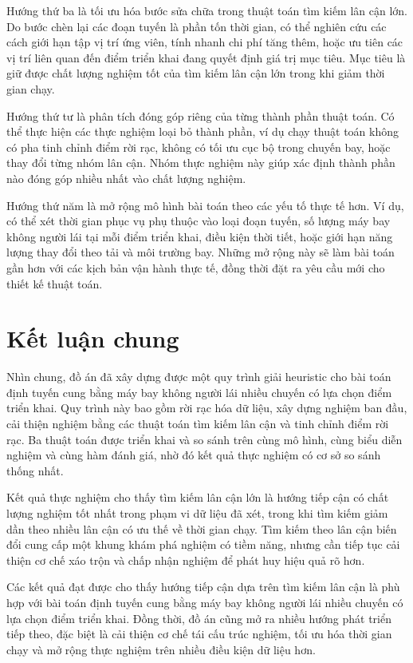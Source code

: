 Hướng thứ ba là tối ưu hóa bước sửa chữa trong thuật toán tìm kiếm lân cận lớn. Do bước chèn lại các đoạn tuyến là phần tốn thời gian, có thể nghiên cứu các cách giới hạn tập vị trí ứng viên, tính nhanh chi phí tăng thêm, hoặc ưu tiên các vị trí liên quan đến điểm triển khai đang quyết định giá trị mục tiêu. Mục tiêu là giữ được chất lượng nghiệm tốt của tìm kiếm lân cận lớn trong khi giảm thời gian chạy.

Hướng thứ tư là phân tích đóng góp riêng của từng thành phần thuật toán. Có thể thực hiện các thực nghiệm loại bỏ thành phần, ví dụ chạy thuật toán không có pha tinh chỉnh điểm rời rạc, không có tối ưu cục bộ trong chuyến bay, hoặc thay đổi từng nhóm lân cận. Nhóm thực nghiệm này giúp xác định thành phần nào đóng góp nhiều nhất vào chất lượng nghiệm.

Hướng thứ năm là mở rộng mô hình bài toán theo các yếu tố thực tế hơn. Ví dụ, có thể xét thời gian phục vụ phụ thuộc vào loại đoạn tuyến, số lượng máy bay không người lái tại mỗi điểm triển khai, điều kiện thời tiết, hoặc giới hạn năng lượng thay đổi theo tải và môi trường bay. Những mở rộng này sẽ làm bài toán gần hơn với các kịch bản vận hành thực tế, đồng thời đặt ra yêu cầu mới cho thiết kế thuật toán.

\section{Kết luận chung}

Nhìn chung, đồ án đã xây dựng được một quy trình giải heuristic cho bài toán định tuyến cung bằng máy bay không người lái nhiều chuyến có lựa chọn điểm triển khai. Quy trình này bao gồm rời rạc hóa dữ liệu, xây dựng nghiệm ban đầu, cải thiện nghiệm bằng các thuật toán tìm kiếm lân cận và tinh chỉnh điểm rời rạc. Ba thuật toán được triển khai và so sánh trên cùng mô hình, cùng biểu diễn nghiệm và cùng hàm đánh giá, nhờ đó kết quả thực nghiệm có cơ sở so sánh thống nhất.

Kết quả thực nghiệm cho thấy tìm kiếm lân cận lớn là hướng tiếp cận có chất lượng nghiệm tốt nhất trong phạm vi dữ liệu đã xét, trong khi tìm kiếm giảm dần theo nhiều lân cận có ưu thế về thời gian chạy. Tìm kiếm theo lân cận biến đổi cung cấp một khung khám phá nghiệm có tiềm năng, nhưng cần tiếp tục cải thiện cơ chế xáo trộn và chấp nhận nghiệm để phát huy hiệu quả rõ hơn.

Các kết quả đạt được cho thấy hướng tiếp cận dựa trên tìm kiếm lân cận là phù hợp với bài toán định tuyến cung bằng máy bay không người lái nhiều chuyến có lựa chọn điểm triển khai. Đồng thời, đồ án cũng mở ra nhiều hướng phát triển tiếp theo, đặc biệt là cải thiện cơ chế tái cấu trúc nghiệm, tối ưu hóa thời gian chạy và mở rộng thực nghiệm trên nhiều điều kiện dữ liệu hơn.
